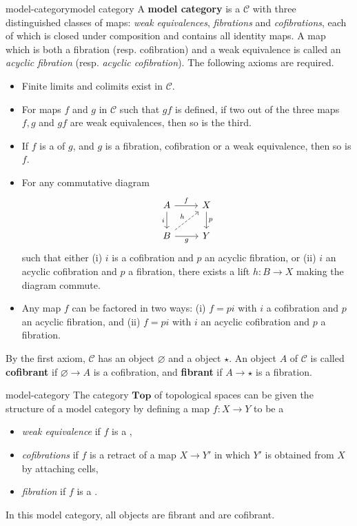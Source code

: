 \begin{topic}{model-category}{model category}
    A \textbf{model category} is a  $\mathcal{C}$ with three distinguished classes of maps: \textit{weak equivalences}, \textit{fibrations} and \textit{cofibrations}, each of which is closed under composition and contains all identity maps. A map which is both a fibration (resp. cofibration) and a weak equivalence is called an \textit{acyclic fibration} (resp. \textit{acyclic cofibration}). The following axioms are required.
    \begin{itemize}
        \item Finite limits and colimits exist in $\mathcal{C}$.
        \item For maps $f$ and $g$ in $\mathcal{C}$ such that $gf$ is defined, if two out of the three maps $f, g$ and $gf$ are weak equivalences, then so is the third.
        \item If $f$ is a  of $g$, and $g$ is a fibration, cofibration or a weak equivalence, then so is $f$.
        \item For any commutative diagram
        \[ \begin{tikzcd} A \arrow[swap]{d}{i} \arrow{r}{f} & X \arrow{d}{p} \\ B \arrow[swap]{r}{g} \arrow[dashed]{ur}{h} & Y \end{tikzcd} \]
        such that either (i) $i$ is a cofibration and $p$ an acyclic fibration, or (ii) $i$ an acyclic cofibration and $p$ a fibration, there exists a lift $h : B \to X$ making the diagram commute.
        \item Any map $f$ can be factored in two ways: (i) $f = pi$ with $i$ a cofibration and $p$ an acyclic fibration, and (ii) $f = pi$ with $i$ an acyclic cofibration and $p$ a fibration.
    \end{itemize}
    By the first axiom, $\mathcal{C}$ has an  object $\varnothing$ and a  object $\star$. An object $A$ of $\mathcal{C}$ is called \textbf{cofibrant} if $\varnothing \to A$ is a cofibration, and \textbf{fibrant} if $A \to \star$ is a fibration.
\end{topic}

\begin{example}{model-category}
    The category $\textbf{Top}$ of topological spaces can be given the structure of a model category by defining a map $f : X \to Y$ to be a
    \begin{itemize}
        \item \textit{weak equivalence} if $f$ is a ,
        \item \textit{cofibrations} if $f$ is a retract of a map $X \to Y'$ in which $Y'$ is obtained from $X$ by attaching cells,
        \item \textit{fibration} if $f$ is a .
    \end{itemize}
    In this model category, all objects are fibrant and  are cofibrant.
\end{example}

